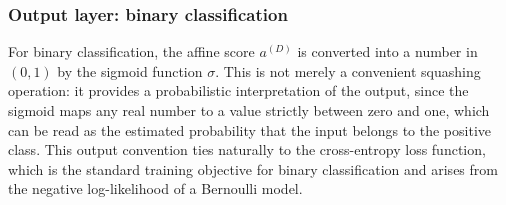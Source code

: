 \begin{center}
\end{center}

\subsubsection*{Output layer: binary classification}

For binary classification, the affine score $a^{(D)}$ is converted into a number in $(0,1)$ by the sigmoid function $\sigma$. This is not merely a convenient squashing operation: it provides a probabilistic interpretation of the output, since the sigmoid maps any real number to a value strictly between zero and one, which can be read as the estimated probability that the input belongs to the positive class. This output convention ties naturally to the cross-entropy loss function, which is the standard training objective for binary classification and arises from the negative log-likelihood of a Bernoulli model.

